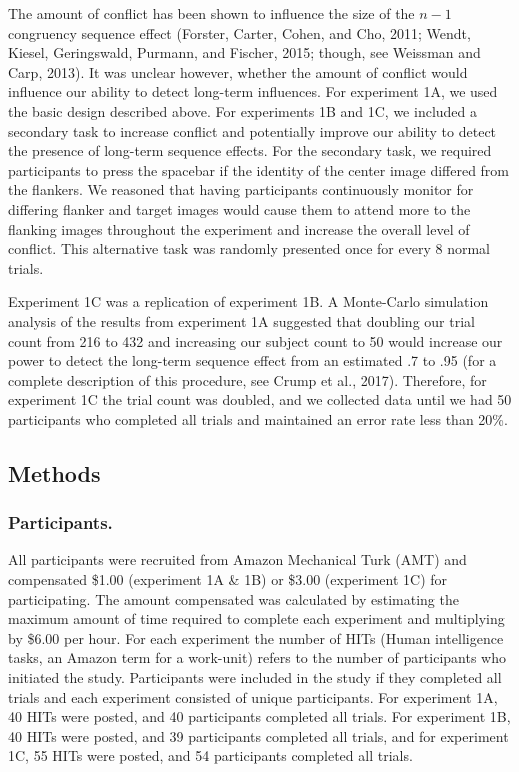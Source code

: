 \documentclass[]{DissertateCUNY}
\begin{document}
The amount of conflict has been shown to influence the size of the
\(n-1\) congruency sequence effect (Forster, Carter, Cohen, and Cho,
2011; Wendt, Kiesel, Geringswald, Purmann, and Fischer, 2015; though,
see Weissman and Carp, 2013). It was unclear however, whether the amount
of conflict would influence our ability to detect long-term influences.
For experiment 1A, we used the basic design described above. For
experiments 1B and 1C, we included a secondary task to increase conflict
and potentially improve our ability to detect the presence of long-term
sequence effects. For the secondary task, we required participants to
press the spacebar if the identity of the center image differed from the
flankers. We reasoned that having participants continuously monitor for
differing flanker and target images would cause them to attend more to
the flanking images throughout the experiment and increase the overall
level of conflict. This alternative task was randomly presented once for
every 8 normal trials.

Experiment 1C was a replication of experiment 1B. A Monte-Carlo
simulation analysis of the results from experiment 1A suggested that
doubling our trial count from 216 to 432 and increasing our subject
count to 50 would increase our power to detect the long-term sequence
effect from an estimated .7 to .95 (for a complete description of this
procedure, see Crump et al., 2017). Therefore, for experiment 1C the
trial count was doubled, and we collected data until we had 50
participants who completed all trials and maintained an error rate less
than 20\%.

\hypertarget{methods-4}{%
\subsection{Methods}\label{methods-4}}

\hypertarget{participants.}{%
\subsubsection{Participants.}\label{participants.}}

All participants were recruited from Amazon Mechanical Turk (AMT) and
compensated \$1.00 (experiment 1A \& 1B) or \$3.00 (experiment 1C) for
participating. The amount compensated was calculated by estimating the
maximum amount of time required to complete each experiment and
multiplying by \$6.00 per hour. For each experiment the number of HITs
(Human intelligence tasks, an Amazon term for a work-unit) refers to the
number of participants who initiated the study. Participants were
included in the study if they completed all trials and each experiment
consisted of unique participants. For experiment 1A, 40 HITs were
posted, and 40 participants completed all trials. For experiment 1B, 40
HITs were posted, and 39 participants completed all trials, and for
experiment 1C, 55 HITs were posted, and 54 participants completed all
trials.
\end{document}
